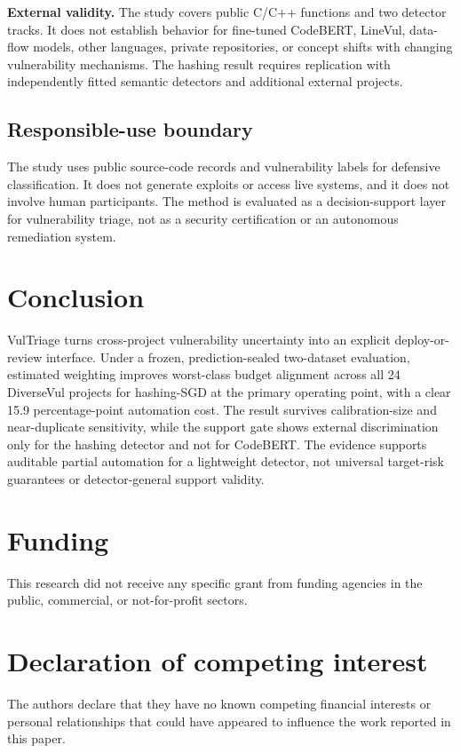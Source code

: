 \documentclass[preprint,12pt]{elsarticle}
\newcommand{\method}{VulTriage\xspace}
\begin{document}
\textbf{External validity.} The study covers public C/C++ functions and two detector tracks. It does not establish behavior for fine-tuned CodeBERT, LineVul, data-flow models, other languages, private repositories, or concept shifts with changing vulnerability mechanisms. The hashing result requires replication with independently fitted semantic detectors and additional external projects.

\subsection{Responsible-use boundary}

The study uses public source-code records and vulnerability labels for defensive classification. It does not generate exploits or access live systems, and it does not involve human participants. The method is evaluated as a decision-support layer for vulnerability triage, not as a security certification or an autonomous remediation system.

\section{Conclusion}

\method turns cross-project vulnerability uncertainty into an explicit deploy-or-review interface. Under a frozen, prediction-sealed two-dataset evaluation, estimated weighting improves worst-class budget alignment across all 24 DiverseVul projects for hashing-SGD at the primary operating point, with a clear 15.9 percentage-point automation cost. The result survives calibration-size and near-duplicate sensitivity, while the support gate shows external discrimination only for the hashing detector and not for CodeBERT. The evidence supports auditable partial automation for a lightweight detector, not universal target-risk guarantees or detector-general support validity.

\section*{Funding}
This research did not receive any specific grant from funding agencies in the public, commercial, or not-for-profit sectors.

\section*{Declaration of competing interest}
The authors declare that they have no known competing financial interests or personal relationships that could have appeared to influence the work reported in this paper.
\end{document}
